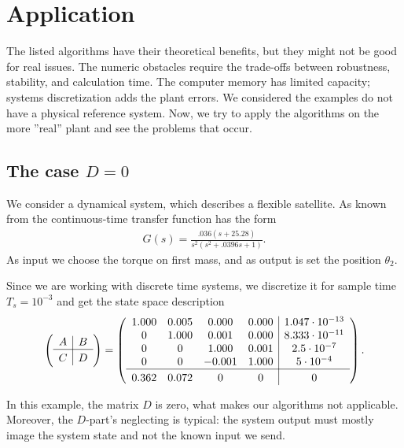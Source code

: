 \chapter{Application}
\label{ch:Allpication}

The listed algorithms have their theoretical benefits, but they might not be good for real issues. The numeric obstacles require the trade-offs between robustness, stability, and calculation time. The computer memory has limited capacity; systems discretization adds the plant errors. We considered the examples do not have a physical reference system. Now, we try to apply the algorithms on the more ''real'' plant and see the problems that occur. 


\section{The case $D = 0$}
		\begin{exam}
		 We consider a dynamical system, which describes a flexible satellite. As known from \cite{SchRC} the continuous-time transfer function has the form  
		\begin{align}
		G(s) = \frac{.036(s + 25.28)}{s^2(s^2 + .0396s + 1)}. 
		\end{align}
		As input we choose the torque on first mass, and as output is set the position $\theta_2$. 
		
		Since we are working with discrete time systems, we discretize it for sample time $T_s = 10^{-3}$  and get the state space description 
		\begin{align}
		\label{eq:Appl:satellite_sys}
		\left( \begin{array}{c | c}
		A & B \\ \hline C & D
		\end{array}\right) = 
		\left(\begin{array}{c c c c | c}
	    1.000  &  0.005  &  0.000  &  0.000 & 1.047\cdot 10^{-13}\\
		0  &  1.000  &  0.001  &  0.000 & 8.333\cdot 10^{-11}\\
		0  &       0  &  1.000  &  0.001 & 2.5\cdot 10^{-7}\\
		0  &       0  & -0.001  &  1.000 & 5\cdot 10^{-4}\\ \hline
        0.362 & 0.072&  0 & 0 & 0
		\end{array}\right). 
	\end{align}
	\end{exam}

In this example, the matrix $D$ is zero, what makes our algorithms not applicable. 
Moreover, the  $D$-part's neglecting is typical: the system output must mostly image the system state and not the known input we send. 

